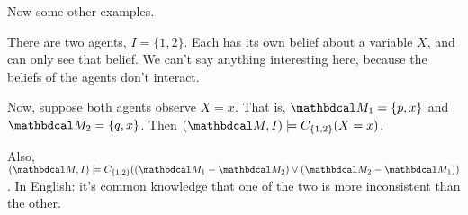 Now some other examples. 

\begin{example}
    There are two agents, $I = \{1,2\}$. Each has its own belief
    about a variable $X$, and can only see that belief. 
    We can't say anything interesting here, because the beliefs
    of the agents don't interact.
    
    Now, suppose both agents observe $X=x$. That is, $\dg M_1 = \{p, x\}$
    and $\dg M_2 = \{q, x\}$. Then  $(\dg M, I) \models C_{\{1,2\}}(X=x)$. 
    
    Also, $(\dg M, I) \models C_{\{1,2\}}( (\dg M_1 - \dg M_2) \lor (\dg M_2 -\dg M_1))$.
    In English: it's common knowledge that one of the two is more inconsistent than the other.
\end{example}

